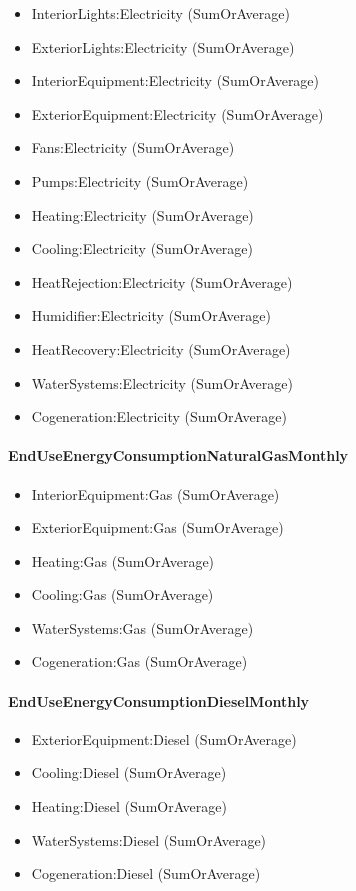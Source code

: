 \begin{itemize}
\item
  InteriorLights:Electricity (SumOrAverage)
\item
  ExteriorLights:Electricity (SumOrAverage)
\item
  InteriorEquipment:Electricity (SumOrAverage)
\item
  ExteriorEquipment:Electricity (SumOrAverage)
\item
  Fans:Electricity (SumOrAverage)
\item
  Pumps:Electricity (SumOrAverage)
\item
  Heating:Electricity (SumOrAverage)
\item
  Cooling:Electricity (SumOrAverage)
\item
  HeatRejection:Electricity (SumOrAverage)
\item
  Humidifier:Electricity (SumOrAverage)
\item
  HeatRecovery:Electricity (SumOrAverage)
\item
  WaterSystems:Electricity (SumOrAverage)
\item
  Cogeneration:Electricity (SumOrAverage)
\end{itemize}

\paragraph{EndUseEnergyConsumptionNaturalGasMonthly}\label{enduseenergyconsumptionnaturalgasmonthly}

\begin{itemize}
\item
  InteriorEquipment:Gas (SumOrAverage)
\item
  ExteriorEquipment:Gas (SumOrAverage)
\item
  Heating:Gas (SumOrAverage)
\item
  Cooling:Gas (SumOrAverage)
\item
  WaterSystems:Gas (SumOrAverage)
\item
  Cogeneration:Gas (SumOrAverage)
\end{itemize}

\paragraph{EndUseEnergyConsumptionDieselMonthly}\label{enduseenergyconsumptiondieselmonthly}

\begin{itemize}
\item
  ExteriorEquipment:Diesel (SumOrAverage)
\item
  Cooling:Diesel (SumOrAverage)
\item
  Heating:Diesel (SumOrAverage)
\item
  WaterSystems:Diesel (SumOrAverage)
\item
  Cogeneration:Diesel (SumOrAverage)
\end{itemize}

